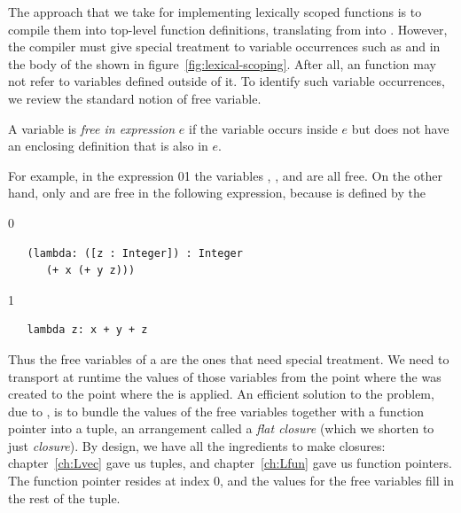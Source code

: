 \documentclass[7x10]{TimesAPriori_MIT}%
\def\racketEd{0}
\def\pythonEd{1}
\providecommand{\BookEdition}{1}
\let\edition\BookEdition
\newcommand{\racket}[1]{{\if\edition\racketEd{#1}\fi}}
\newcommand{\pythonColor}[0]{}
\newcommand{\python}[1]{{\if\edition\pythonEd\pythonColor #1\fi}}
\numberwithin{theorem}{chapter}
\numberwithin{definition}{chapter}
\numberwithin{equation}{chapter}
\begin{document}
The approach that we take for implementing lexically scoped functions
is to compile them into top-level function definitions, translating
from \LangLam{} into \LangFun{}.  However, the compiler must give
special treatment to variable occurrences such as  and
 in the body of the  shown in
figure~\ref{fig:lexical-scoping}. After all, an \LangFun{} function
may not refer to variables defined outside of it. To identify such
variable occurrences, we review the standard notion of free variable.

\begin{definition}\normalfont
A variable is \emph{free in expression} $e$ if the variable occurs
inside $e$ but does not have an enclosing definition that is also in
$e$.
\end{definition}

For example, in the expression
\racket{}\python{}
the variables , , and  are all free.  On the other hand,
only  and  are free in the following expression,
because  is defined by the 
{\if\edition\racketEd
\begin{lstlisting}
   (lambda: ([z : Integer]) : Integer
      (+ x (+ y z)))
\end{lstlisting}
\fi}
{\if\edition\pythonEd\pythonColor
\begin{lstlisting}
   lambda z: x + y + z
\end{lstlisting}
\fi}
%
\noindent Thus the free variables of a  are the ones that
need special treatment. We need to transport at runtime the values
of those variables from the point where the  was created
to the point where the  is applied. An efficient solution
to the problem, due to \citet{Cardelli:1983aa}, is to bundle the
values of the free variables together with a function pointer into a
tuple, an arrangement called a \emph{flat closure} (which we shorten
to just \emph{closure}).
%
By design, we have all the ingredients to make closures:
chapter~\ref{ch:Lvec} gave us tuples, and chapter~\ref{ch:Lfun} gave us
function pointers. The function pointer resides at index $0$, and the
values for the free variables fill in the rest of the tuple.
\end{document}

